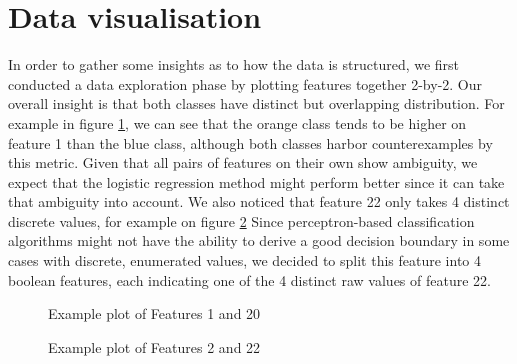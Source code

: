 \documentclass[10pt,conference,compsocconf]{IEEEtran}
\begin{document}
\section{Data visualisation}
In order to gather some insights as to how the data is structured, we first conducted a data exploration phase by plotting features together 2-by-2. Our overall insight is that both classes have distinct but overlapping distribution. For example in figure \ref{f1-f20}, we can see that the orange class tends to be higher on feature 1 than the blue class, although both classes harbor counterexamples by this metric. Given that all pairs of features on their own show ambiguity, we expect that the logistic regression method might perform better since it can take that ambiguity into account. We also noticed that feature 22 only takes 4 distinct discrete values, for example on figure \ref{f2-f22} Since perceptron-based classification algorithms might not have the ability to derive a good decision boundary in some cases with discrete, enumerated values, we decided to split this feature into 4 boolean features, each indicating one of the 4 distinct raw values of feature 22.
\cite{anderson04,wavelab}  %

\begin{figure}
	\caption{Example plot of Features 1 and 20}
	\label{f1-f20}
\end{figure}

\begin{figure}
	\caption{Example plot of Features 2 and 22}
	\label{f2-f22}
\end{figure}

%
%
\end{document}
